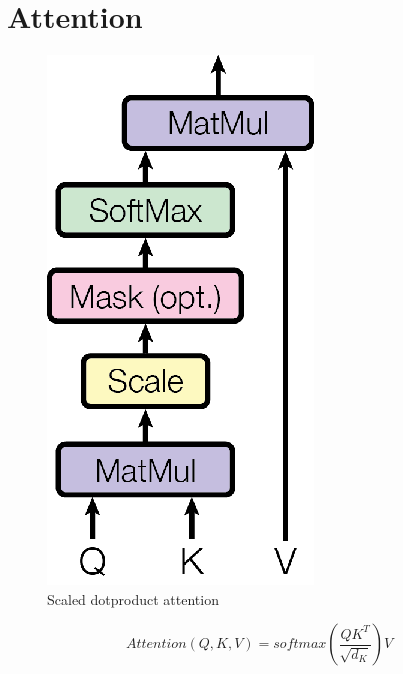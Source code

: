 \documentclass[conference]{IEEEtran}
\begin{document}
\section{Attention}

\begin{figure}[htbp]
\centerline{\includegraphics{img/scaled_dotproduct_attention.png}}
\caption{Scaled dotproduct attention \cite{attention_is_all_you_need}}
\label{fig}
\end{figure}

\begin{equation}
    Attention(Q,K,V) = softmax(\frac{QK^T}{\sqrt{d_K}})V
\end{equation}
\end{document}
